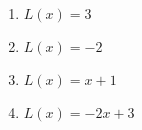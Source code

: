 \documentclass{ximera}
\begin{document}
\begin{enumerate}
\begin{enumerate}
 \begin{multicols}{4}

  \begin{enumerate}

  \item $L(x) = 3$

  \item $L(x) = -2$

  \item $L(x) = x+1$

  \item $L(x) = -2x+3$

  \end{enumerate}

  \end{multicols}

  \end{enumerate}
\setcounter{HW}{\value{enumi}}
\end{enumerate}
\end{document}

